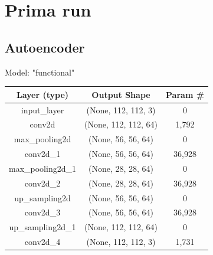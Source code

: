 \documentclass[12pt,a4paper,openright,twoside]{book}
\begin{document}
\section{Prima run}
\subsection{Autoencoder}
Model: "functional"\\
\begin{tabular}{|| c | c | c ||}
  \hline
  Layer (type) & Output Shape & Param \# \\
  \hline
  input\_layer & (None, 112, 112, 3) & 0 \\
  \hline
  conv2d & (None, 112, 112, 64) & 1,792 \\
  \hline
  max\_pooling2d & (None, 56, 56, 64) & 0 \\
  \hline
  conv2d\_1 & (None, 56, 56, 64) & 36,928 \\
  \hline
  max\_pooling2d\_1 & (None, 28, 28, 64) & 0 \\
  \hline
  conv2d\_2 & (None, 28, 28, 64) & 36,928 \\
  \hline
  up\_sampling2d & (None, 56, 56, 64) & 0 \\
  \hline
  conv2d\_3 & (None, 56, 56, 64) & 36,928 \\
  \hline
  up\_sampling2d\_1 & (None, 112, 112, 64) & 0 \\
  \hline
  conv2d\_4 & (None, 112, 112, 3) & 1,731 \\
  \hline  
\end{tabular}
\end{document}
